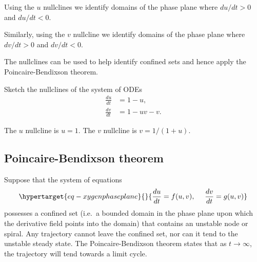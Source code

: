 \documentclass[
  letterpaper,
  DIV=11,
  numbers=noendperiod]{scrreprt}
\begin{document}
Using the \(u\) nullclines we identify domains of the phase plane where
\(du/dt >0\) and \(du/dt <0\).

Similarly, using the \(v\) nullcline we identify domains of the phase
plane where \(dv/dt >0\) and \(dv/dt <0\).

The nullclines can be used to help identify confined sets and hence
apply the Poincaire-Bendixson theorem.

\begin{tcolorbox}[enhanced jigsaw, bottomtitle=1mm, rightrule=.15mm, colback=white, leftrule=.75mm, title=\textcolor{quarto-callout-note-color}{\faInfo}\hspace{0.5em}{Note}, bottomrule=.15mm, coltitle=black, toptitle=1mm, breakable, colframe=quarto-callout-note-color-frame, titlerule=0mm, toprule=.15mm, opacitybacktitle=0.6, arc=.35mm, colbacktitle=quarto-callout-note-color!10!white, left=2mm, opacityback=0]

Sketch the nullclines of the system of ODEs \[
\begin{aligned}
\frac{du}{dt}&=1-u,  \nonumber \\
\frac{dv}{dt}&=1-uv-v.
\end{aligned}
\]

\end{tcolorbox}

\begin{tcolorbox}[enhanced jigsaw, bottomtitle=1mm, rightrule=.15mm, colback=white, leftrule=.75mm, title=\textcolor{quarto-callout-tip-color}{\faLightbulb}\hspace{0.5em}{Tip}, bottomrule=.15mm, coltitle=black, toptitle=1mm, breakable, colframe=quarto-callout-tip-color-frame, titlerule=0mm, toprule=.15mm, opacitybacktitle=0.6, arc=.35mm, colbacktitle=quarto-callout-tip-color!10!white, left=2mm, opacityback=0]

The \(u\) nullcline is \(u=1\). The \(v\) nullcline is \(v=1/(1+u)\).

\end{tcolorbox}

\hypertarget{poincaire-bendixson-theorem}{%
\subsection{Poincaire-Bendixson
theorem}\label{poincaire-bendixson-theorem}}

Suppose that the system of equations
\begin{equation}\protect\hypertarget{eq-xygenphaseplane}{}{
\frac{du}{dt}=f(u,v), \ \ \ \ \frac{dv}{dt}=g(u,v)
}\label{eq-xygenphaseplane}\end{equation} possesses a confined set
(i.e.~a bounded domain in the phase plane upon which the derivative
field points into the domain) that contains an unstable node or spiral.
Any trajectory cannot leave the confined set, nor can it tend to the
unstable steady state. The Poincaire-Bendixson theorem states that as
\(t\rightarrow \infty\), the trajectory will tend towards a limit cycle.
\end{document}
